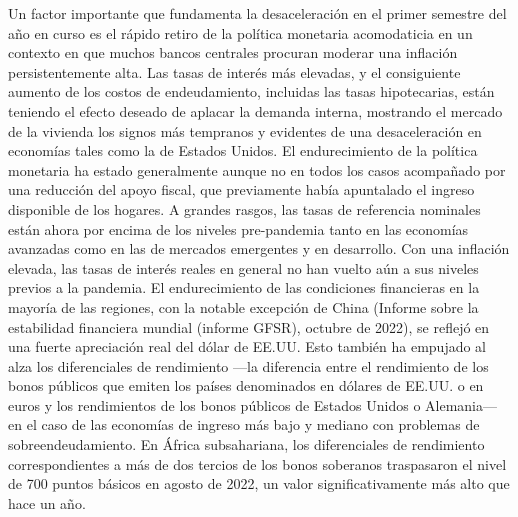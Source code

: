 \documentclass{article}
\theoremstyle{mytheoremstyle}
\theoremstyle{mytheoremstyle}
\theoremstyle{myproblemstyle}
\begin{document}
Un factor importante que fundamenta la desaceleración en el primer semestre del año en curso es el rápido retiro de la política monetaria acomodaticia en un contexto en que muchos bancos centrales procuran moderar una inflación persistentemente alta. Las tasas de interés más elevadas, y el consiguiente aumento de los costos de endeudamiento, incluidas las tasas hipotecarias, están teniendo el efecto deseado de aplacar la demanda interna, mostrando el mercado de la vivienda los signos más tempranos y evidentes de una desaceleración en economías tales como la de Estados Unidos. El endurecimiento de la política monetaria ha estado generalmente aunque no en todos los casos acompañado por una reducción del apoyo fiscal, que previamente había apuntalado el ingreso disponible de los hogares. A grandes rasgos, las tasas de referencia nominales están ahora por encima de los niveles pre-pandemia tanto en las economías avanzadas como en las de mercados emergentes y en desarrollo. Con una inflación elevada, las tasas de interés reales en general no han vuelto aún a sus niveles previos a la pandemia. El endurecimiento de las condiciones financieras en la mayoría de las regiones, con la notable excepción de China (Informe sobre la estabilidad financiera mundial (informe GFSR), octubre de 2022), se reflejó en una fuerte apreciación real del dólar de EE.UU. Esto también ha empujado al alza los diferenciales de rendimiento —la diferencia entre el rendimiento de los bonos públicos que emiten los países denominados en dólares de EE.UU. o en euros y los rendimientos de los bonos públicos de Estados Unidos o Alemania— en el caso de las economías de ingreso más bajo y mediano con problemas de sobreendeudamiento. En África subsahariana, los diferenciales de rendimiento correspondientes a más de dos tercios de los bonos soberanos traspasaron el nivel de 700 puntos básicos en agosto de 2022, un valor significativamente más alto que hace un año.\\
\end{document}
